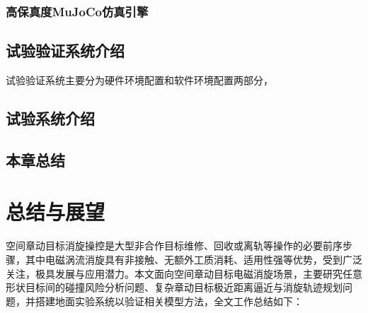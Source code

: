 \documentclass[lang=chs, degree=master, blindreview=false, winfonts=true]{yanputhesis}
\begin{document}
\subsection{高保真度MuJoCo仿真引擎}
\section{试验验证系统介绍}
试验验证系统主要分为硬件环境配置和软件环境配置两部分，
\section{试验系统介绍}

\section{本章总结}


\cleardoublepage

\chapter{总结与展望}
空间章动目标消旋操控是大型非合作目标维修、回收或离轨等操作的必要前序步骤，其中电磁涡流消旋具有非接触、无额外工质消耗、适用性强等优势，受到广泛关注，极具发展与应用潜力。本文面向空间章动目标电磁消旋场景，主要研究任意形状目标间的碰撞风险分析问题、复杂章动目标极近距离逼近与消旋轨迹规划问题，并搭建地面实验系统以验证相关模型方法，全文工作总结如下：
\end{document}
